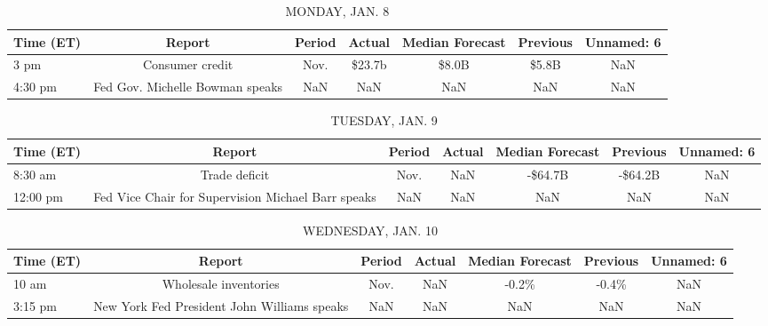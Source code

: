 \documentclass{article}%
\begin{document}
%
\normalsize%


\begin{table}[htbp]%
\caption{MONDAY, JAN. 8}%
\centering%
\begin{adjustbox}{width=1\textwidth}%
\begin{tabular}{lcccccc}
\toprule
Time (ET) &                          Report & Period & Actual & Median Forecast & Previous & Unnamed: 6 \\
\midrule
     3 pm &                 Consumer credit &   Nov. & \$23.7b &           \$8.0B &    \$5.8B &        NaN \\
  4:30 pm & Fed Gov. Michelle Bowman speaks &    NaN &    NaN &             NaN &      NaN &        NaN \\
\bottomrule
\end{tabular}
%
\end{adjustbox}%
\end{table}

%


\begin{table}[htbp]%
\caption{TUESDAY, JAN. 9}%
\centering%
\begin{adjustbox}{width=1\textwidth}%
\begin{tabular}{lcccccc}
\toprule
Time (ET) &                                             Report & Period & Actual & Median Forecast & Previous & Unnamed: 6 \\
\midrule
  8:30 am &                                      Trade deficit &   Nov. &    NaN &         -\$64.7B &  -\$64.2B &        NaN \\
 12:00 pm & Fed Vice Chair for Supervision Michael Barr speaks &    NaN &    NaN &             NaN &      NaN &        NaN \\
\bottomrule
\end{tabular}
%
\end{adjustbox}%
\end{table}

%


\begin{table}[htbp]%
\caption{WEDNESDAY, JAN. 10}%
\centering%
\begin{adjustbox}{width=1\textwidth}%
\begin{tabular}{lcccccc}
\toprule
Time (ET) &                                      Report & Period & Actual & Median Forecast & Previous & Unnamed: 6 \\
\midrule
    10 am &                       Wholesale inventories &   Nov. &    NaN &           -0.2\% &    -0.4\% &        NaN \\
  3:15 pm & New York Fed President John Williams speaks &    NaN &    NaN &             NaN &      NaN &        NaN \\
\bottomrule
\end{tabular}
%
\end{adjustbox}%
\end{table}
\end{document}
